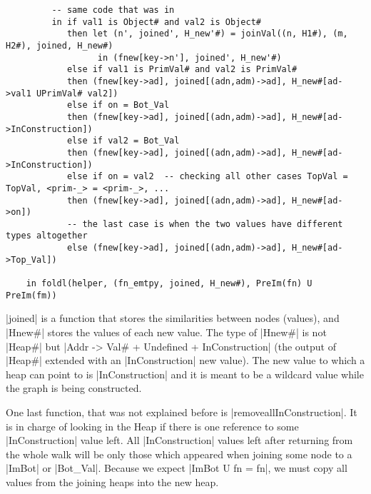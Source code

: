 \begin{verbatim}
         -- same code that was in
         in if val1 is Object# and val2 is Object#
            then let (n', joined', H_new'#) = joinVal((n, H1#), (m, H2#), joined, H_new#)
                  in (fnew[key->n'], joined', H_new'#)
            else if val1 is PrimVal# and val2 is PrimVal#
            then (fnew[key->ad], joined[(adn,adm)->ad], H_new#[ad->val1 UPrimVal# val2])
            else if on = Bot_Val
            then (fnew[key->ad], joined[(adn,adm)->ad], H_new#[ad->InConstruction])
            else if val2 = Bot_Val
            then (fnew[key->ad], joined[(adn,adm)->ad], H_new#[ad->InConstruction])
            else if on = val2  -- checking all other cases TopVal = TopVal, <prim-_> = <prim-_>, ...
            then (fnew[key->ad], joined[(adn,adm)->ad], H_new#[ad->on])
            -- the last case is when the two values have different types altogether
            else (fnew[key->ad], joined[(adn,adm)->ad], H_new#[ad->Top_Val])

    in foldl(helper, (fn_emtpy, joined, H_new#), PreIm(fn) U PreIm(fm))
\end{verbatim}


\pycode|joined| is a function that stores the similarities between nodes
(values), and \pycode|Hnew#| stores the values of each new value. The
type of \pycode|Hnew#| is not \pycode|Heap#| but
\pycode|Addr -> Val# + Undefined + InConstruction|
(the output of \pycode|Heap#| extended with an \pycode|InConstruction|
new value). The new value to which a heap can point to is
\pycode|InConstruction| and it is meant to be a wildcard value while the
graph is being constructed.


One last function, that was not explained before is
\pycode|removeallInConstruction|. It is in charge of looking in the Heap
if there is one reference to some \pycode|InConstruction| value left.
All \pycode|InConstruction| values left after returning from the whole
walk will be only those which appeared when joining some node to a
\pycode|ImBot| or \pycode|Bot_Val|. Because we expect
\pycode|ImBot U fn = fn|, we must copy all values from the joining
heaps into the new heap.

